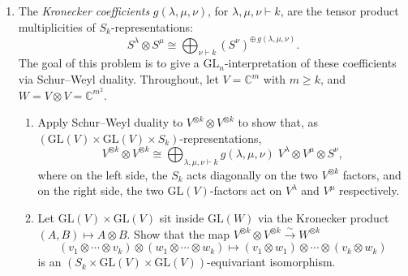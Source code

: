 \documentclass[12pt]{article}
\newcommand{\C}{\mathbb{C}}
\newcommand{\Res}{\text{Res}}
\newcommand{\Ind}{\text{Ind}}
\newcommand{\GL}{\mathrm{GL}}
\begin{document}
\begin{enumerate}
\begin{enumerate}
\item The \emph{Littlewood--Richardson coefficients} $c^\lambda_{\mu\nu}$, for
$|\mu|+|\nu| = |\lambda|$, are defined as the tensor product multiplicities of
polynomial $\GL_n(\C)$-representations:
\[
V^\mu \otimes V^\nu \cong \bigoplus_\lambda (V^\lambda)^{\oplus\, c^\lambda_{\mu\nu}}.
\]
(Since the character of $V^\lambda$ is $s_\lambda$, these are also the structure
constants for the Schur basis: $s_\mu s_\nu = \sum_\lambda c^\lambda_{\mu\nu} s_\lambda$.)
Using part~(a), show that as $S_n$ representations
\[
\Ind^{S_n}_{S_k \times S_m}(S^\mu \otimes S^\nu) \cong \bigoplus_\lambda
(S^\lambda)^{\oplus\, c^\lambda_{\mu\nu}},
\]
and
\[
\Res^{S_n}_{S_k \times S_m} S^\lambda \cong \bigoplus_{\mu,\nu}
(S^\mu \otimes S^\nu)^{\oplus\, c^\lambda_{\mu\nu}}.
\]
where $k = |\mu|$, $m = |\nu|$, and $n = k+m$. (Don't get confused between internal and external tensor product; the latter occurs when we have a direct product of groups.)
\end{enumerate}


\item[2.] The \emph{Kronecker coefficients} $g(\lambda, \mu, \nu)$, for
$\lambda, \mu, \nu \vdash k$, are the tensor product multiplicities of
$S_k$-representations:
\[
S^\lambda \otimes S^\mu \cong \bigoplus_{\nu \vdash k} (S^\nu)^{\oplus\, g(\lambda,\mu,\nu)}.
\]
The goal of this problem is to give a $\GL_n$-interpretation of these coefficients
via Schur--Weyl duality. Throughout, let $V = \C^m$ with $m \geq k$, and $W = V\otimes V = \C^{m^2}$.

\begin{enumerate}
\item Apply Schur--Weyl duality to $V^{\otimes k} \otimes V^{\otimes k}$
to show that, as $(\GL(V) \times \GL(V) \times S_k)$-representations,
\[
V^{\otimes k} \otimes V^{\otimes k}
\cong \bigoplus_{\lambda, \mu, \nu \vdash k} g(\lambda,\mu,\nu)\;
V^\lambda \otimes V^\mu \otimes S^\nu,
\]
where on the left side, the $S_k$ acts diagonally on the two $V^{\otimes k}$ factors, and on the right side, the two $\GL(V)$-factors act on $V^\lambda$ and $V^\mu$ respectively.

\item Let $\GL(V) \times \GL(V)$ sit inside $\GL(W)$ via the Kronecker product $(A, B) \mapsto A \otimes B$. Show that the map $V^{\otimes k} \otimes V^{\otimes k} \xrightarrow{\sim} W^{\otimes k}$
\[
(v_1 \otimes \cdots \otimes v_k) \otimes (w_1 \otimes \cdots \otimes w_k)
\mapsto (v_1 \otimes w_1) \otimes \cdots \otimes (v_k \otimes w_k)
\]
is an $(S_k\times \GL(V)\times \GL(V))$-equivariant isomorphism.


\end{enumerate}
\end{enumerate}
\end{document}
